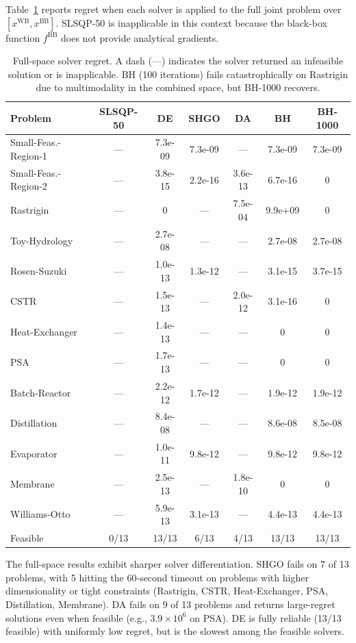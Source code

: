 \documentclass[12pt,a4paper]{article}%
\theoremstyle{plain}%
\theoremstyle{remark}%
\theoremstyle{definition}%
\def\WB{\mathrm{WB}}
\def\BB{\mathrm{BB}}
\begin{document}
\begin{appendices}
Table~\ref{tab:full_regret} reports regret when each solver is applied to the full joint problem over $[x^{\WB}, x^{\BB}]$. SLSQP-50 is inapplicable in this context because the black-box function $f^{\BB}$ does not provide analytical gradients.

\begin{table}[htbp]
\centering
\caption{Full-space solver regret. A dash (---) indicates the solver returned an infeasible solution or is inapplicable. BH (100 iterations) fails catastrophically on Rastrigin due to multimodality in the combined space, but BH-1000 recovers.}
\label{tab:full_regret}
\footnotesize
\begin{tabular}{@{}lcccccc@{}}
\toprule
\textbf{Problem} & \textbf{SLSQP-50} & \textbf{DE} & \textbf{SHGO} & \textbf{DA} & \textbf{BH} & \textbf{BH-1000} \\
\midrule
Small-Feas.-Region-1 & --- & 7.3e-09 & 7.3e-09 & --- & 7.3e-09 & 7.3e-09 \\
Small-Feas.-Region-2 & --- & 3.8e-15 & 2.2e-16 & 3.6e-13 & 6.7e-16 & 0 \\
Rastrigin & --- & 0 & --- & 7.5e-04 & 9.9e+09 & 0 \\
Toy-Hydrology & --- & 2.7e-08 & --- & --- & 2.7e-08 & 2.7e-08 \\
Rosen-Suzuki & --- & 1.0e-13 & 1.3e-12 & --- & 3.1e-15 & 3.7e-15 \\
CSTR & --- & 1.5e-13 & --- & 2.0e-12 & 3.1e-16 & 0 \\
Heat-Exchanger & --- & 1.4e-13 & --- & --- & 0 & 0 \\
PSA & --- & 1.7e-13 & --- & --- & 0 & 0 \\
Batch-Reactor & --- & 2.2e-12 & 1.7e-12 & --- & 1.9e-12 & 1.9e-12 \\
Distillation & --- & 8.4e-08 & --- & --- & 8.6e-08 & 8.5e-08 \\
Evaporator & --- & 1.0e-11 & 9.8e-12 & --- & 9.8e-12 & 9.8e-12 \\
Membrane & --- & 2.5e-13 & --- & 1.8e-10 & 0 & 0 \\
Williams-Otto & --- & 5.9e-13 & 3.1e-13 & --- & 4.4e-13 & 4.4e-13 \\
\midrule
Feasible & 0/13 & 13/13 & 6/13 & 4/13 & 13/13 & 13/13 \\
\bottomrule
\end{tabular}
\end{table}

The full-space results exhibit sharper solver differentiation. SHGO fails on 7 of 13 problems, with 5 hitting the 60-second timeout on problems with higher dimensionality or tight constraints (Rastrigin, CSTR, Heat-Exchanger, PSA, Distillation, Membrane). DA fails on 9 of 13 problems and returns large-regret solutions even when feasible (e.g., $3.9 \times 10^6$ on PSA). DE is fully reliable (13/13 feasible) with uniformly low regret, but is the slowest among the feasible solvers.


\end{appendices}
\end{document}
